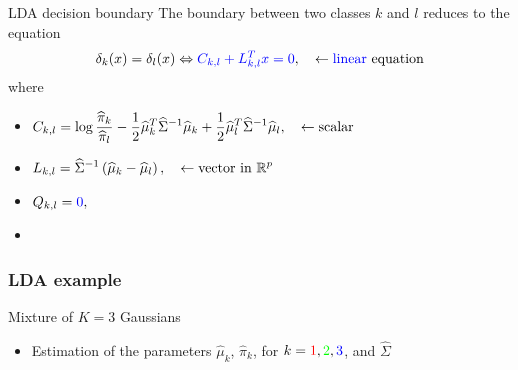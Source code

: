 \begin{frame}{LDA decision boundary}
The boundary between two classes $k$ and $l$ reduces to the equation
\begin{align*}
\delta_k(x)= \delta_l(x)  \Leftrightarrow {\textcolor{blue}{ C_{k,l} + L_{k,l}^T x  = 0 }}, \quad \leftarrow \textrm{{\textcolor{blue}{linear}} equation}
\end{align*}
where
\begin{itemize}
 \item $\begin{displaystyle}
        C_{k,l}= {  \log \frac{\widehat{\pi}_k}{\widehat{\pi}_l}
        - \frac{1}{2} {\widehat{\mu}_k}^T \widehat{\Sigma}^{-1} \widehat{\mu}_k + \frac{1}{2}
 {\widehat{\mu}_l}^T \widehat{\Sigma}^{-1} \widehat{\mu}_l},
       \end{displaystyle} \quad \leftarrow \textrm{scalar}$
 \item $\begin{displaystyle}
          L_{k,l}=  \widehat{\Sigma}^{-1} \left( \widehat{\mu}_k -  \widehat{\mu}_l \right),
        \end{displaystyle}\quad \leftarrow \textrm{vector in } \mathbb{R}^p$
\item $\begin{displaystyle}
          Q_{k,l}= \structuretext{0},
        \end{displaystyle}$
\end{itemize}

\begin{itemize}
 \item[\doigt] 
\end{itemize}


\end{frame}




\begin{frame}
  \frametitle{LDA example}
\begin{block}{Mixture of $K=3$ Gaussians}
\begin{itemize}
   \item Estimation of the parameters  $\hat{\mu}_k$, $\hat{\pi}_k$, for
   $k= \textcolor{red}{1},\textcolor{green}{2},\textcolor{blue}{3}$, and $\hat{\Sigma}$
\end{itemize}
\end{block}
\vspace*{-5mm}

\begin{center}
\end{center}

\end{frame}


